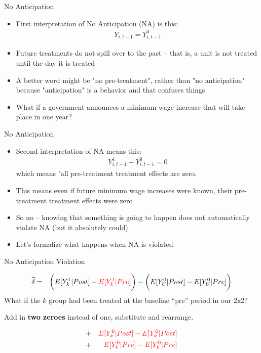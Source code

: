 \documentclass{beamer}
\begin{document}
\begin{frame}{No Anticipation}

\begin{itemize}
\item First interpretation of No Anticipation (NA) is this:
	\begin{eqnarray*}
	Y_{i,t-1}=Y^0_{i,t-1}
	\end{eqnarray*}
\item Future treatments do not spill over to the past -- that is, a unit is not treated until the day it is treated
\item A better word might be "no pre-treatment", rather than "no anticipation" because "anticipation" is a behavior and that confuses things
\item What if a government announces a minimum wage increase that will take place in one year?

\end{itemize}

\end{frame}

\begin{frame}{No Anticipation}

\begin{itemize}
\item Second interpretation of NA means this:
	\begin{eqnarray*}
	Y^1_{i,t-1} - Y^0_{i,t-1}=0
	\end{eqnarray*}which means "all pre-treatment treatment effects are zero.
\item This means even if future minimum wage increases were known, their pre-treatment treatment effects were zero
\item So no -- knowing that something is going to happen does not automatically violate NA (but it absolutely could)
\item Let's formalize what happens when NA is violated

\end{itemize}

\end{frame}




\begin{frame}{No Anticipation Violation}


\begin{eqnarray*}
\widehat{\delta} &=& \bigg ( E[Y^1_k|Post] - \textcolor{red}{E[Y^1_k|Pre]} \bigg ) - \bigg ( E[Y^0_U | Post ] - E[ Y^0_U | Pre] \bigg) \\
\end{eqnarray*}What if the $k$ group had been treated at the baseline ``pre'' period in our 2x2?

\bigskip

Add in \textbf{two zeroes} instead of one, substitute and rearrange.

\begin{eqnarray*}
&+& \textcolor{red}{E[Y^0_k|Post] - E[Y^0_k|Post]} \\
&+& \textcolor{red}{E[Y^0_k|Pre] - E[Y^0_k|Pre]}
\end{eqnarray*}

\end{frame}
\end{document}
